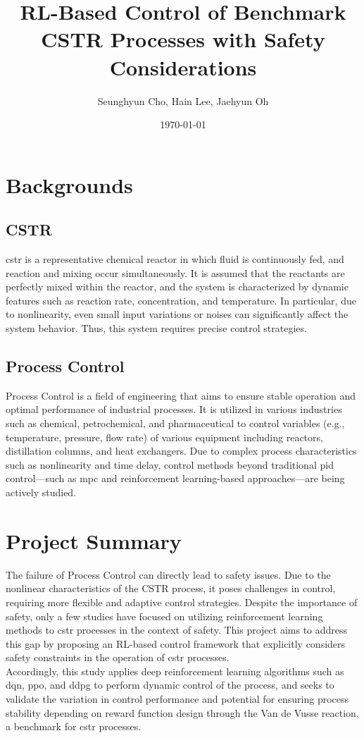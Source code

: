 \documentclass[11pt]{article}
\begin{document}
\title{RL-Based Control of Benchmark CSTR Processes with Safety Considerations}
\author{Seunghyun Cho, Hain Lee, Jaehyun Oh}
\date{\today}


\setlength{\droptitle}{-4cm}  %
\maketitle

 
\section{Backgrounds}
\subsection{CSTR}
\gls{cstr} is a representative chemical reactor in which fluid is continuously fed, and reaction and mixing occur simultaneously. 
It is assumed that the reactants are perfectly mixed within the reactor, and the system is characterized by dynamic features such as reaction rate, concentration, and temperature. 
In particular, due to nonlinearity, even small input variations or noises can significantly affect the system behavior. Thus, this system requires precise control strategies.


\subsection{Process Control}
Process Control is a field of engineering that aims to ensure stable operation and optimal performance of industrial processes.
It is utilized in various industries such as chemical, petrochemical, and pharmaceutical to control variables (e.g., temperature, pressure, flow rate) of various equipment including reactors, distillation columns, and heat exchangers. 
Due to complex process characteristics such as nonlinearity and time delay, control methods beyond traditional \gls{pid} control—such as \gls{mpc} and reinforcement learning-based approaches—are being actively studied.


\section{Project Summary}
The failure of Process Control can directly lead to safety issues. 
Due to the nonlinear characteristics of the CSTR process, it poses challenges in control, requiring more flexible and adaptive control strategies. 
Despite the importance of safety, only a few studies have focused on utilizing reinforcement learning methods to \gls{cstr} processes in the context of safety.
This project aims to address this gap by proposing an RL-based control framework that explicitly considers safety constraints in the operation of \gls{cstr} processes. \\ 
Accordingly, this study applies deep reinforcement learning algorithms such as \gls{dqn}, \gls{ppo}, and \gls{ddpg} to perform dynamic control of the process, 
and seeks to validate the variation in control performance and potential for ensuring process stability depending on reward function design through the Van de Vusse reaction, a benchmark for \gls{cstr} processes.
\end{document}
